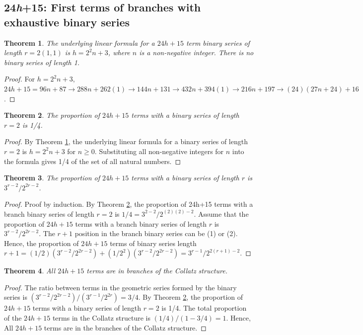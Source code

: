 \documentclass[sn-mathphys-num, pdflatex]{sn-jnl}
\newtheorem{theorem}{Theorem}[section]
\begin{document}
\subsection{24\textit{h}+15: First terms of branches with exhaustive binary series}\label{sec6.3}
\begin{theorem}\label{th:24h15_base}
    The underlying linear formula for a $24h+15$ term binary series of length $r=2 (1,1)$ is $h=2^2n+3$, where $n$ is a non-negative integer. There is no binary series of length 1.
\end{theorem}
\begin{proof}
    For $h=2^2n+3$, $24h+15 = 96n+87\to 288n+262(1)\to 144n+131\to 432n+394(1)\to 216n+197\to (24)(27n+24)+16$.
\end{proof}

\begin{theorem}\label{th:24h15_prop}
    The proportion of $24h+15$ terms with a binary series of length $r=2$ is 1/4. 
\end{theorem}
\begin{proof}
    By Theorem \ref{th:24h15_base}, the underlying linear formula for a binary series of length $r=2$ is $h=2^2n+3$ for $n \ge 0$. Substituting all non-negative integers for $n$ into the formula gives 1/4 of the set of all natural numbers.
\end{proof}

\begin{theorem}
    The proportion of $24h+15$ terms with a binary series of length $r$ is $3^{r-2}/2^{2r-2}$.
\end{theorem}
\begin{proof}
    Proof by induction.
    By Theorem \ref{th:24h15_prop}, the proportion of 24h+15 terms with a branch binary series of length $r=2$ is $1/4 = 3^{2-2}/2^{(2)(2)-2}$.
    Assume that the proportion of $24h+15$ terms with a branch binary series of length $r$ is $3^{r-2}/2^{2r-2}$.
    The $r+1$ position in the branch binary series can be (1) or (2).
    Hence, the proportion of $24h+15$ terms of binary series length $r+1 = (1/2)(3^{r-2}/2^{2r-2})+(1/2^2)(3^{r-2}/2^{2r-2}) = 3^{r-1}/2^{2(r+1)-2}$.
\end{proof}

\begin{theorem}\label{th:24h15_final}
    All $24h+15$ terms are in branches of the Collatz structure.
\end{theorem}
\begin{proof}
    The ratio between terms in the geometric series formed by the binary series is $(3^{r-2}/2^{2r-2}) / (3^{r-1}/2^{2r}) = 3/4$.
    By Theorem \ref{th:24h15_prop}, the proportion of $24h+15$ terms with a binary series of length $r=2$ is 1/4.
    The total proportion of the $24h+15$ terms in the Collatz structure is $(1/4)/(1 - 3/4) = 1$.
    Hence, All $24h+15$ terms are in the branches of the Collatz structure.
\end{proof}
\end{document}
